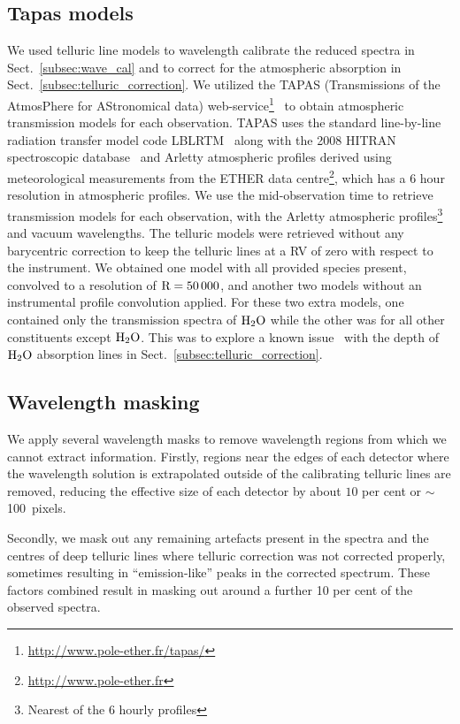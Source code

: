 \documentclass[fleqn,usenatbib]{mnras}
\begin{document}
\subsection{Tapas models}
\label{subsec:tapas_models}
We used telluric line models to wavelength calibrate the reduced spectra in Sect.~\ref{subsec:wave_cal} and to correct for the atmospheric absorption in Sect.~\ref{subsec:telluric_correction}. We utilized the TAPAS (Transmissions of the AtmosPhere for AStronomical data) web-service\footnote{\url{http://www.pole-ether.fr/tapas/}}~\citep{bertaux_tapas_2014} to obtain atmospheric transmission models for each observation. TAPAS uses the standard line-by-line radiation transfer model code LBLRTM~\citep{clough_linebyline_1995} along with the 2008 HITRAN spectroscopic database~\citep{rothman_hitran_2009} and Arletty atmospheric profiles derived using meteorological measurements from the ETHER data centre\footnote{\url{http://www.pole-ether.fr}}, which has a 6 hour resolution in atmospheric profiles.
We use the mid-observation time to retrieve transmission models for each observation, with the Arletty atmospheric profiles\footnote{Nearest of the 6 hourly profiles} and vacuum wavelengths. The telluric models were retrieved without any barycentric correction to keep the telluric lines at a RV of zero with respect to the instrument. We obtained one model with all provided species present, convolved to a resolution of \(\rm R=50\,000\), and another two models without an instrumental profile convolution applied. For these two extra models, one contained only the transmission spectra of \(\rm H_{2}O\) while the other was for all other constituents except \(\rm H_{2}O\). This was to explore a known issue~\citep{bertaux_tapas_2014} with the depth of \(\rm H_{2}O\) absorption lines in Sect.~\ref{subsec:telluric_correction}.

\subsection{Wavelength masking}
We apply several wavelength masks to remove wavelength regions from which we cannot extract information.
Firstly, regions near the edges of each detector where the wavelength solution is extrapolated outside of the calibrating telluric lines are removed, reducing the effective size of each detector by about \(10\) per cent or \(\sim\)100~pixels.

Secondly, we mask out any remaining artefacts present in the spectra and the centres of deep telluric lines where telluric correction was not corrected properly, sometimes resulting in ``emission-like'' peaks in the corrected spectrum. These factors combined result in masking out around a further 10 per cent of the observed spectra.
\end{document}
